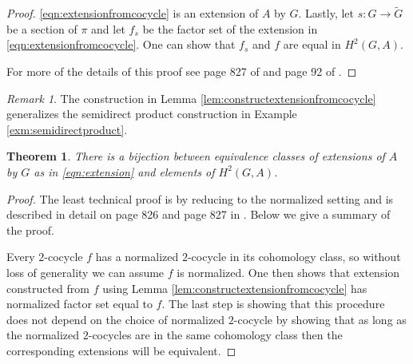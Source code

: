 \documentclass{dcthesis}
\newcommand{\mm}[1]{{\color{blue} \sf MM: [#1]}}
\newcommand{\wt}[1]{\widetilde{#1}}
\numberwithin{equation}{section}
\newtheorem{theorem}[equation]{Theorem}
\theoremstyle{definition}
\theoremstyle{remark}
\newtheorem{remark}[equation]{Remark}
\begin{document}
{{{\begin{proof}
      \eqref{eqn:extensionfromcocycle}
      is an extension of $A$ by $G$.
      Lastly,
      let $s\colon G\to\wt{G}$
      be a section of $\pi$
      and let $f_s$ be the factor set
      of the extension in
      \eqref{eqn:extensionfromcocycle}.
      One can show that $f_s$ and $f$
      are equal in
      $H^2(G,A)$.
      \par
      For more of the details of this proof
      see page 827 of \cite{DF}
      and page 92 of \cite{brown}.
    \end{proof}
    \begin{remark}
      \label{rmk:semidirectproducttrivialcocycle}
      The construction in
      Lemma \ref{lem:constructextensionfromcocycle}
      generalizes the
      semidirect product construction
      in Example \ref{exm:semidirectproduct}.
    \end{remark}
    \begin{theorem}
      \label{thm:dfthm36}
      There is a bijection between equivalence
      classes of extensions of $A$ by $G$
      as in
      \eqref{eqn:extension}
      and
      elements of $H^2(G,A)$.
    \end{theorem}
    \begin{proof}
      The least technical proof is
      by reducing to the normalized setting
      and is described in detail
      on page 826 and page 827
      in \cite{DF}.
      Below we give a summary of the proof.
      \par
      Every $2$-cocycle $f$ has a
      normalized $2$-cocycle in its
      cohomology class,
      so without loss of generality we
      can assume $f$ is normalized.
      One then shows that
      extension constructed from $f$
      using Lemma
      \ref{lem:constructextensionfromcocycle}
      has normalized factor set equal to $f$.
      The last step is showing that
      this procedure does not depend on the
      choice of normalized $2$-cocycle
      by showing that as long
      as the normalized $2$-cocycles
      are in the same cohomology class
      then the corresponding extensions
      will be equivalent.
    \end{proof}
}}}
\end{document}

